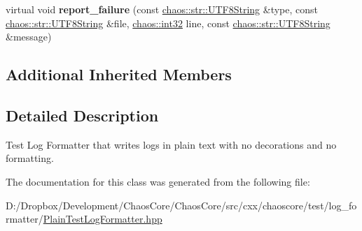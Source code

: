 \begin{DoxyCompactItemize}
\item 
\hypertarget{classchaos_1_1test_1_1log__formatter_1_1_plain_test_log_formatter_a361fdf2f1108832a0e74b5a311dd00b0}{}virtual void {\bfseries report\+\_\+failure} (const \hyperlink{classchaos_1_1str_1_1_u_t_f8_string}{chaos\+::str\+::\+U\+T\+F8\+String} \&type, const \hyperlink{classchaos_1_1str_1_1_u_t_f8_string}{chaos\+::str\+::\+U\+T\+F8\+String} \&file, \hyperlink{namespacechaos_ad1de7efb430365afd2c9446a0f522a90}{chaos\+::int32} line, const \hyperlink{classchaos_1_1str_1_1_u_t_f8_string}{chaos\+::str\+::\+U\+T\+F8\+String} \&message)\label{classchaos_1_1test_1_1log__formatter_1_1_plain_test_log_formatter_a361fdf2f1108832a0e74b5a311dd00b0}

\end{DoxyCompactItemize}
\subsection*{Additional Inherited Members}


\subsection{Detailed Description}
Test Log Formatter that writes logs in plain text with no decorations and no formatting. 

The documentation for this class was generated from the following file\+:\begin{DoxyCompactItemize}
\item 
D\+:/\+Dropbox/\+Development/\+Chaos\+Core/\+Chaos\+Core/src/cxx/chaoscore/test/log\+\_\+formatter/\hyperlink{_plain_test_log_formatter_8hpp}{Plain\+Test\+Log\+Formatter.\+hpp}\end{DoxyCompactItemize}

